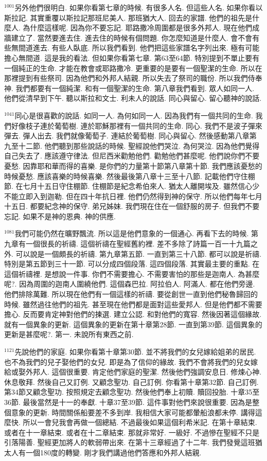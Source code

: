 \documentclass{book}
\begin{document}
$^{1001}$另外他們很明白.
如果你看第七章的時候.
有很多人名.
但這些人名.
如果你看以斯拉記.
其實重覆以斯拉記那班尼美人.
那班猶大人.
回去的家譜.
他們的祖先是什麼人.
為什麼這樣呢.
因為你不要忘記.
耶路撒冷周圍都是很多外邦人.
現在他們成牆建立了.
當然要進去住.
進去住的時候有個問題.
你怎麼知道是什麼人.
會不會有些無間道進去.
有些人臥底.
所以我們看到.
他們把這些家譜名字列出來.
極有可能擔心無間道.
這是我的看法.
但如果你看第七章.
第63至64節.
特別提到不單止要有一個純正的生命.
才能在教會或耶路撒冷.
更重要的是要有一個聖潔的生命.
所以在那裡提到有些祭司.
因為他們和外邦人結親.
所以失去了祭司的職份.
所以我們侍奉神.
我們都要有一個純潔.
和有一個聖潔的生命.
第八章我們看到.
眾人如同一人.
他們從清早到下午.
聽以斯拉和文士.
利未人的說話.
同心與留心.
留心聽神的說話.

$^{1041}$同心是很喜歡的說話.
如同一人.
為何如同一人.
因為我們有一個共同的生命.
我們好像枝子連於葡萄樹.
連於耶穌那裡有一個共同的生命.
同心.
我們不是波子彈來彈去.
彈人出去.
我們就像葡萄子.
連結於葡萄樹.
同心與留心.
然後感動第八章第九至十二節.
他們聽到那些說話的時候.
聖經說他們哭泣.
為何哭泣.
因為他們覺得自己失去了.
應該遵守律法.
但尼西米勸勉他們.
勸勉他們甚麼呢.
他們說你們不要憂愁.
因靠耶和華而得的喜樂.
是你們的力量第十節第八章第十節.
我們應該憂愁的時候憂愁.
應該喜樂的時候喜樂.
然後最後第八章十三至十八節.
記載他們守住棚節.
在七月十五日守住棚節.
住棚節是紀念希伯來人.
猶太人離開埃及.
雖然信心少不能立即入到迦勒.
但在四十年抗日裡.
他們仍然得到神的保守.
所以他們每年七月十五日.
都要紀念神的保守.
弟兄姊妹.
我們現在住在一個舒服的房子.
但我們不要忘記.
如果不是神的恩典.
神的供應.

$^{1081}$我們可能仍然在曠野飄流.
所以這是他們意象的一個通心.
再看下去的時候.
第九章有一個很長的祈禱.
這個祈禱在聖經舊約裡.
差不多除了詩篇一百一十九篇之外.
可以說是一個頗長的祈禱.
第九章第五節.
一直到第三十八節.
都可以說是祈禱.
特別是第五節到三十一節.
可以分成四個段落.
這四個段落.
其實最主要的重點.
在這個祈禱裡.
是想說一件事.
你們不需要擔心.
不需要害怕的那些是迦南人.
為甚麼呢?.
因為周圍的迦南人圍繞他們.
這個森巴拉.
阿拉伯人.
阿滿人.
都在他們旁邊.
他們排除萬難.
所以現在他們有一個這樣的祈禱.
要從創世一直到他們秘魯歸回的時候.
雖然過往他們的祖先.
甚至現在他們都是面對這些愛邦人.
但是他們都不需要擔心.
反而要肯定神對他們的揀選.
建立公認.
和對他們的寬容.
然後因著這個緣故.
就有一個異象的更新.
這個異象的更新在第十章第28節.
一直到第39節.
這個異象的更新是甚麼呢?.
第一.
未說所有東西之前.

$^{1121}$先說他們的家庭.
如果你看第十章第30節.
並不將我們的女兒嫁給姐弟的居民.
也不為我們的兒子娶他們的女兒.
即是為了信仰的緣故.
我們不會將我們的兒女嫁給或娶外邦人.
這個很重要.
肯定他們家庭的聖潔.
然後他們強調安息日.
修煉心神.
休息敬拜.
然後自己又訂例.
又顧念聖功.
自己訂例.
你看第十章第32節.
自己訂例.
第34節又顧念聖功.
按照規定去顧念聖功.
然後他們奉上初贖.
贖回投胎.
十章35至36節.
最後當然是十一的奉獻.
十章37至39節.
這件事對他們來說很重要.
因為是整個意象的更新.
時間關係船要差不多到岸.
我相信大家可能都暈船浪都未停.
講得這麼快.
所以一會兒我會再做一個總結.
不過最後如果這個利希米記.
在第十章結束.
或者在十一章結束.
或者在十二章結束.
那就非常好.
一級好.
不過慘在聖經不只是引落陽善.
聖經更加將人的軟弱帶出來.
在第十三章經過了十二年.
我們發覺這班猶太人有一個180度的轉變.
剛才我們講過他們答應和外邦人結親.
\end{document}
